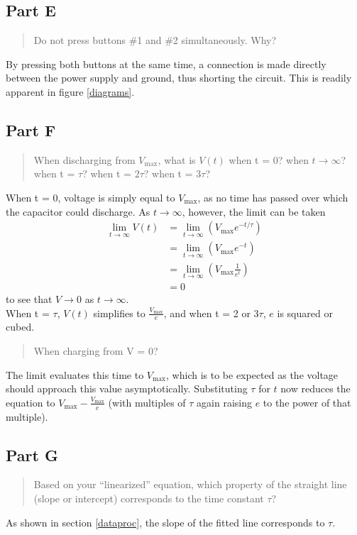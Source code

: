 \documentclass{report}
\begin{document}
	\subsection{Part E}
	\begin{quote}
		Do not press buttons \#1 and \#2 simultaneously. Why?
	\end{quote}
	By pressing both buttons at the same time, a connection is made directly between the power supply and ground, thus shorting the circuit. This is readily apparent in figure \ref{diagrams}.
	
	\subsection{Part F}
	\begin{quote}
		When discharging from $V_\mathrm{max}$, what is $V(t)$ when t = 0? when $t \to \infty$? when t = $\tau$? when t = $2\tau$? when t = $3\tau$?
	\end{quote}
	When t = 0, voltage is simply equal to $V_\mathrm{max}$, as no time has passed over which the capacitor could discharge. As $t\to\infty$, however, the limit can be taken
	\begin{align*}
		\lim_{t\to\infty}V(t) &= \lim_{t\to\infty}(V_\mathrm{max}e^{-t/\tau}) \\
			&= \lim_{t\to\infty}(V_\mathrm{max}e^{-t}) \\
			&= \lim_{t\to\infty}(V_\mathrm{max}\frac{1}{e^{t}}) \\
			&= 0
	\end{align*}
	to see that $V\to0$ as $t\to\infty$.\\
	When t = $\tau$, $V(t)$ simplifies to $\frac{V_\mathrm{max}}{e}$, and when t = 2 or 3$\tau$, $e$ is squared or cubed.\\
	
	\begin{quote}
		When charging from V = 0?
	\end{quote}
	The limit evaluates this time to $V_\mathrm{max}$, which is to be expected as the voltage should approach this value asymptotically.
	Substituting $\tau$ for $t$ now reduces the equation to $V_\mathrm{max} - \frac{V_\mathrm{max}}{e}$ (with multiples of $\tau$ again raising $e$ to the power of that multiple).

	\subsection{Part G}
	\begin{quote}
		Based on your “linearized” equation, which property of the straight line (slope or intercept) corresponds to the time constant $\tau$?
	\end{quote}
	As shown in section \ref{dataproc}, the slope of the fitted line corresponds to $\tau$.
\end{document}
